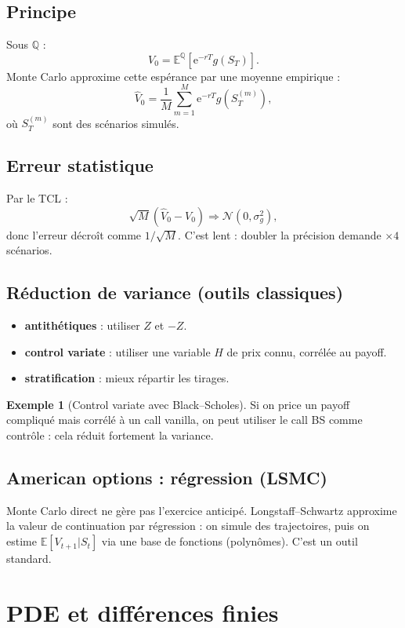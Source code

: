 \documentclass[11pt,a4paper]{report}
\newcommand{\ee}{\mathrm{e}}
\newcommand{\E}{\mathbb{E}}
\newcommand{\Q}{\mathbb{Q}}
\newcommand{\1}{\mathbbm{1}}
\newcommand{\Normal}{\mathcal{N}}
\theoremstyle{definition}
\newtheorem{example}{Exemple}[chapter]
\theoremstyle{plain}
\theoremstyle{remark}
\begin{document}
\subsection{Principe}
Sous $\Q$ :
\[
V_0 = \E^\Q\left[\ee^{-rT} g(S_T)\right].
\]
Monte Carlo approxime cette espérance par une moyenne empirique :
\[
\widehat{V}_0 = \frac{1}{M}\sum_{m=1}^M \ee^{-rT} g(S_T^{(m)}),
\]
où $S_T^{(m)}$ sont des scénarios simulés.

\subsection{Erreur statistique}
Par le TCL :
\[
\sqrt{M}\left(\widehat{V}_0 - V_0\right)\Rightarrow \Normal(0,\sigma_g^2),
\]
donc l'erreur décroît comme $1/\sqrt{M}$.
C'est lent : doubler la précision demande $\times 4$ scénarios.

\subsection{Réduction de variance (outils classiques)}
\begin{itemize}
  \item \textbf{antithétiques} : utiliser $Z$ et $-Z$.
  \item \textbf{control variate} : utiliser une variable $H$ de prix connu, corrélée au payoff.
  \item \textbf{stratification} : mieux répartir les tirages.
\end{itemize}

\begin{example}[Control variate avec Black--Scholes]
Si on price un payoff compliqué mais corrélé à un call vanilla,
on peut utiliser le call BS comme contrôle : cela réduit fortement la variance.
\end{example}

\subsection{American options : régression (LSMC)}
Monte Carlo direct ne gère pas l'exercice anticipé.
Longstaff--Schwartz approxime la valeur de continuation par régression :
on simule des trajectoires, puis on estime $\E[V_{t+1}|S_t]$ via une base de fonctions (polynômes).
C'est un outil standard.

\section{PDE et différences finies}
\label{sec:fd}
\end{document}
